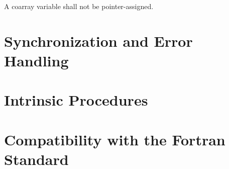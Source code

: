 \begin{Constraints C}
\item A coarray variable shall not be pointer-assigned.
\end{Constraints C}

\section{Synchronization and Error Handling}
\label{sec:Synchronization and Error Handling}

\section{Intrinsic Procedures}
\label{sec:Intrinsic Procedures}

\section{Compatibility with the Fortran Standard}
\label{sec:Compatibility with the Fortran Standard}

